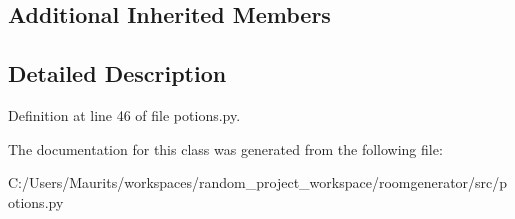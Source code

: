 \subsection*{Additional Inherited Members}


\subsection{Detailed Description}


Definition at line 46 of file potions.\+py.



The documentation for this class was generated from the following file\+:\begin{DoxyCompactItemize}
\item 
C\+:/\+Users/\+Maurits/workspaces/random\+\_\+project\+\_\+workspace/roomgenerator/src/potions.\+py\end{DoxyCompactItemize}
